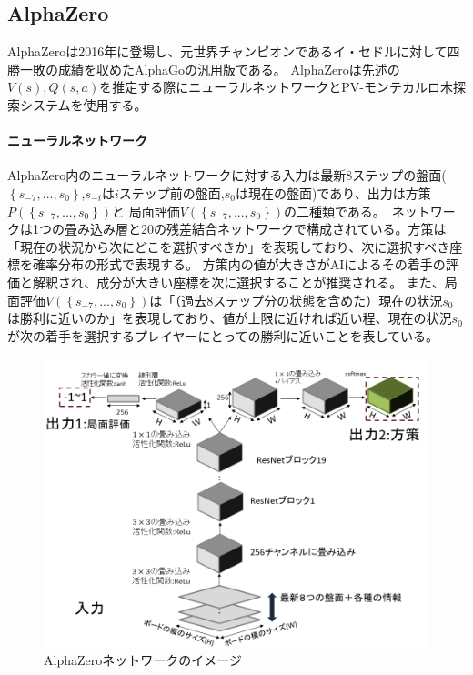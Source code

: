 \subsection{AlphaZero\cite{AlphaZero}}
AlphaZeroは2016年に登場し、元世界チャンピオンであるイ・セドルに対して四勝一敗の成績を収めたAlphaGoの汎用版である。
AlphaZeroは先述の$V(s),Q(s, a)$を推定する際にニューラルネットワークとPV-モンテカルロ木探索システムを使用する。
\paragraph{ニューラルネットワーク}
AlphaZero内のニューラルネットワークに対する入力は最新$8$ステップの盤面($\left\{ s_{-7}, ..., s_0 \right\}$,$s_{-i}$は$i$ステップ前の盤面,$s_{0}$は現在の盤面)であり、出力は方策$P(\left\{ s_{-7}, ..., s_0 \right\})$と
局面評価$V(\left\{ s_{-7}, ..., s_0 \right\})$の二種類である。\
ネットワークは1つの畳み込み層と20の残差結合ネットワークで構成されている。方策は「現在の状況から次にどこを選択すべきか」を表現しており、次に選択すべき座標を確率分布の形式で表現する。
方策内の値が大きさがAIによるその着手の評価と解釈され、成分が大きい座標を次に選択することが推奨される。
また、局面評価$V(\left\{ s_{-7}, ..., s_0 \right\})$は「（過去8ステップ分の状態を含めた）現在の状況$s_0$は勝利に近いのか」を表現しており、値が上限に近ければ近い程、現在の状況$s_0$が次の着手を選択するプレイヤーにとっての勝利に近いことを表している。
\begin{figure}[t]
	\centering
	\includegraphics[width=\linewidth]{./figure/network.png}
	\caption{AlphaZeroネットワークのイメージ}
	\label{fig:network}
\end{figure}
